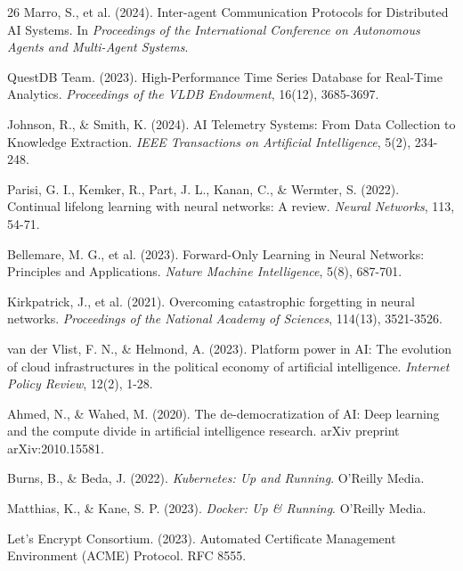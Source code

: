 \documentclass[11pt]{article}
\begin{document}
\begin{thebibliography}{26}
		Marro, S., et al. (2024). Inter-agent Communication Protocols for Distributed AI Systems. In \textit{Proceedings of the International Conference on Autonomous Agents and Multi-Agent Systems}.
		
		QuestDB Team. (2023). High-Performance Time Series Database for Real-Time Analytics. \textit{Proceedings of the VLDB Endowment}, 16(12), 3685-3697.
		
		Johnson, R., \& Smith, K. (2024). AI Telemetry Systems: From Data Collection to Knowledge Extraction. \textit{IEEE Transactions on Artificial Intelligence}, 5(2), 234-248.
		
		Parisi, G. I., Kemker, R., Part, J. L., Kanan, C., \& Wermter, S. (2022). Continual lifelong learning with neural networks: A review. \textit{Neural Networks}, 113, 54-71.
		
		Bellemare, M. G., et al. (2023). Forward-Only Learning in Neural Networks: Principles and Applications. \textit{Nature Machine Intelligence}, 5(8), 687-701.
		
		Kirkpatrick, J., et al. (2021). Overcoming catastrophic forgetting in neural networks. \textit{Proceedings of the National Academy of Sciences}, 114(13), 3521-3526.
		
		van der Vlist, F. N., \& Helmond, A. (2023). Platform power in AI: The evolution of cloud infrastructures in the political economy of artificial intelligence. \textit{Internet Policy Review}, 12(2), 1-28.
		
		Ahmed, N., \& Wahed, M. (2020). The de-democratization of AI: Deep learning and the compute divide in artificial intelligence research. arXiv preprint arXiv:2010.15581.
		
		Burns, B., \& Beda, J. (2022). \textit{Kubernetes: Up and Running}. O'Reilly Media.
		
		Matthias, K., \& Kane, S. P. (2023). \textit{Docker: Up \& Running}. O'Reilly Media.
		
		Let's Encrypt Consortium. (2023). Automated Certificate Management Environment (ACME) Protocol. RFC 8555.
		

\end{thebibliography}
\end{document}
